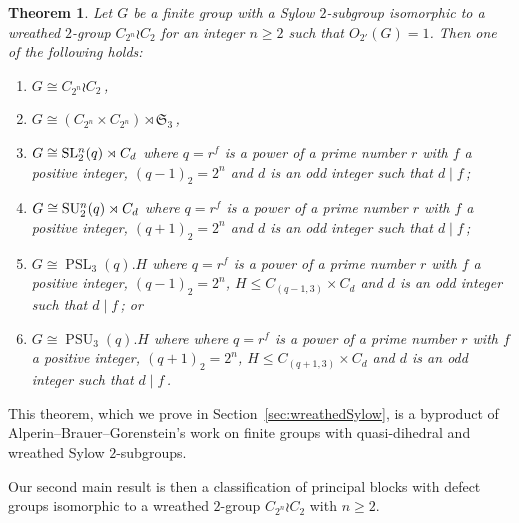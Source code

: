 \documentclass[12pt,a4paper]{amsart}
\theoremstyle{plain}\newtheorem{Theorem}{Theorem}[section]
\theoremstyle{plain}\newtheorem{Conjecture}[Theorem]{Conjecture}
\theoremstyle{plain}\newtheorem{Corollary}[Theorem]{Corollary}
\theoremstyle{plain}\newtheorem{Lemma}[Theorem]{Lemma}
\theoremstyle{plain}\newtheorem{Proposition}[Theorem]{Proposition}
\theoremstyle{definition}\newtheorem{Definition}[Theorem]{Definition}
\theoremstyle{definition}\newtheorem{Example}[Theorem]{Example}
\theoremstyle{definition}\newtheorem{Examples}[Theorem]{Examples}
\theoremstyle{definition}\newtheorem{Remark}[Theorem]{Remark}
\theoremstyle{definition}\newtheorem{Question}[Theorem]{Question}
\theoremstyle{definition}\newtheorem{Notation}[Theorem]{Notation}
\theoremstyle{definition}\newtheorem{Hypothesis}[Theorem]{Hypothesis}
\theoremstyle{definition}\newtheorem{Assumption}[Theorem]{Assumption}
\theoremstyle{definition}\newtheorem{Strategy}[Theorem]{Strategy}
\theoremstyle{definition}\newtheorem{Contents}[Theorem]{Contents}
\theoremstyle{definition}\newtheorem{Computations}[Theorem]{Computations}
\theoremstyle{definition}\newtheorem{Equivalences}[Theorem]{Equivalences}
\theoremstyle{definition}\newtheorem{Notation/Definition}[Theorem]{Notation/Definition}
\theoremstyle{definition}\newtheorem{noth}[Theorem]{}
\theoremstyle{plain}\newtheorem{Step}[Theorem]{Step}
\newcommand{\PSL}{\operatorname{PSL}}
\newcommand{\PSU}{\operatorname{PSU}}
\begin{document}
\begin{Theorem}\label{thm:classification_wr} 
Let $G$ be a finite group with a Sylow $2$-subgroup
isomorphic to a wreathed $2$-group $C_{2^n}\wr C_2$ for an integer $n\geq 2$ 
such that $O_{2'}(G) = 1$. 
Then one of the following \smallskip holds: 
\begin{enumerate}[leftmargin=17mm]
\item[{\rm\sf(WR1)}] $G\cong
C_{2^n}\wr C_2$\,,
\item[{\rm\sf (WR2)}] $G
\cong (C_{2^n}\times C_{2^n})\rtimes \mathfrak S_3$\,,
\item[{\rm\sf(WR3)}]
$G\cong{\mathrm{SL}}{\color{black}^n_2}(q) \rtimes C_d$
where $q=r^{f}$ is a power of a prime number  $r$ with $f$ a positive integer, $(q-1)_2=2^n$ and $d$ is an odd integer such that  $d\mid f$\,;
\item[{\rm\sf(WR4)}]
$G\cong{\mathrm{SU}}{\color{black}^n_2}(q) \rtimes C_d$ where $q=r^{f}$ is a power of a prime number  $r$ with $f$ a positive integer,  $(q+1)_2=2^n$ and $d$ is an odd integer such that  $d\mid f$\,;
\item[{\rm\sf(WR5)}] $G\cong\PSL_3 (q).H$ where $q=r^{f}$ is a power of a prime number  $r$ with $f$ a positive integer,  $(q-1)_2=2^n$, 
$H \leq C_{(q-1, 3)}\times C_d$ and $d$ is an odd integer such that $d\mid f$\,; or
\item[{\rm\sf(WR6)}]
$G\cong\PSU_3(q).H$ where where $q=r^{f}$ is a power of a prime number  $r$ with $f$ a positive integer,  $(q+1)_2=2^n$, $H \leq
C_{(q+1, 3)}\times C_d$  and $d$ is an odd integer such that $d\mid f$\,.
\end{enumerate}
\end{Theorem}

This theorem, which we prove in  Section~\ref{sec:wreathedSylow},
 is a byproduct of  Alperin--Brauer--Gorenstein's work \cite{ABG70} on finite groups with 
quasi-dihedral and wreathed Sylow $2$-subgroups.
\par 
Our second main result is then a classification of principal blocks with  defect groups isomorphic to 
a wreathed $2$-group $C_{2^n}\wr C_2$ with $n\geq 2$. 
\end{document}
